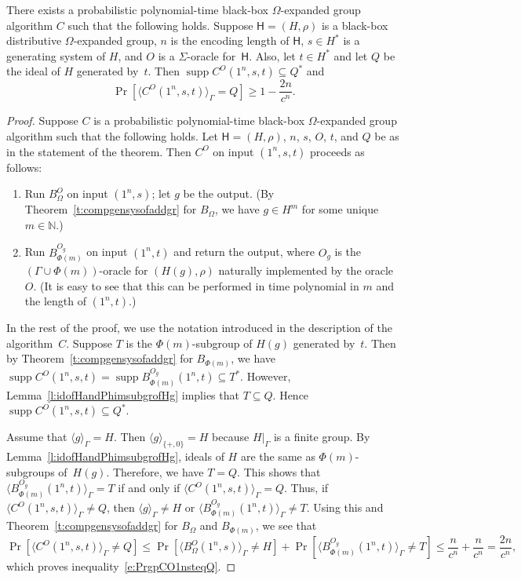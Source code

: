 \documentclass{jgcc}
\DeclareMathOperator{\supp}{supp}
\newcommand{\bb}{\mathsf}
\newcommand{\Add}[1]{#1|_\Gamma}
\newcommand{\alg}[1]{\langle#1\rangle}
\newcommand{\gp}[1]{\langle#1\rangle_\Gamma}
\newcommand{\N}{\mathbb N}
\newcommand{\Prob}[1]{\Pr[#1]}
\begin{document}
\begin{thm}
\label{t:compgensysofaddgrofid}
There exists a probabilistic polynomial-time black-box
$\Omega$-expanded group algorithm $C$ such that the
following holds. Suppose $\bb H=(H,\rho)$ is a black-box
distributive $\Omega$-expanded group, $n$ is the encoding
length of $\bb H$, $s\in H^*$ is a generating system of $H$,
and $O$ is a $\Sigma$-oracle for~$\bb H$. Also, let $t\in
H^*$ and let $Q$ be the ideal of $H$ generated by~$t$. Then
$\supp C^O(1^n,s,t)\subseteq Q^*$ and
\begin{equation}
\label{e:PrgpCO1nsteqQ}
\Prob{\gp{C^O(1^n,s,t)}=Q}\ge1-\frac{2n}{c^n}.
\end{equation}
\end{thm}
\begin{proof}
Suppose $C$ is a probabilistic polynomial-time black-box
$\Omega$-expanded group algorithm such that the following
holds. Let $\bb H=(H,\rho)$, $n$, $s$, $O$, $t$, and $Q$ be
as in the statement of the theorem. Then $C^O$ on input
$(1^n,s,t)$ proceeds as follows:
\begin{enumerate}
\item Run $B_\Omega^O$ on input $(1^n,s)$; let $g$ be the
output. (By Theorem~\ref{t:compgensysofaddgr} for
$B_\Omega$, we have $g\in H^m$ for some unique $m\in\N$.)

\item Run $B_{\Phi(m)}^{O_g}$ on input $(1^n,t)$ and return
the output, where $O_g$ is the $(\Gamma\cup\Phi(m))$-oracle
for $(H(g),\rho)$ naturally implemented by the oracle~$O$.
(It is easy to see that this can be performed in time
polynomial in $m$ and the length of $(1^n,t)$.)
\end{enumerate}

In the rest of the proof, we use the notation introduced in
the description of the algorithm~$C$. Suppose $T$ is the
$\Phi(m)$-subgroup of $H(g)$ generated by~$t$. Then by
Theorem~\ref{t:compgensysofaddgr} for $B_{\Phi(m)}$, we have
$\supp C^O(1^n,s,t)=\supp B_{\Phi(m)}^{O_g}(1^n,t)\subseteq
T^*$. However, Lemma~\ref{l:idofHandPhimsubgrofHg} implies
that $T\subseteq Q$. Hence $\supp C^O(1^n,s,t)\subseteq
Q^*$.

Assume that $\alg g_\Gamma=H$. Then $\alg g_{\{+,0\}}=H$
because $\Add H$ is a finite group. By
Lemma~\ref{l:idofHandPhimsubgrofHg}, ideals of $H$ are the
same as $\Phi(m)$-subgroups of~$H(g)$. Therefore, we have
$T=Q$. This shows that $\gp{B_{\Phi(m)}^{O_g}(1^n,t)}=T$ if
and only if $\gp{C^O(1^n,s,t)}=Q$. Thus, if
$\gp{C^O(1^n,s,t)}\ne Q$, then $\alg g_\Gamma\ne H$ or
$\gp{B_{\Phi(m)}^{O_g}(1^n,t)}\ne T$. Using this and
Theorem~\ref{t:compgensysofaddgr} for $B_\Omega$ and
$B_{\Phi(m)}$, we see that
\[
\Prob{\gp{C^O(1^n,s,t)}\ne
Q}\le\Prob{\gp{B_\Omega^O(1^n,s)}\ne
H}+\Prob{\gp{B_{\Phi(m)}^{O_g}(1^n,t)}\ne T}\le\frac
n{c^n}+\frac n{c^n}=\frac{2n}{c^n},
\]
which proves inequality~\eqref{e:PrgpCO1nsteqQ}.
\end{proof}
\end{document}

